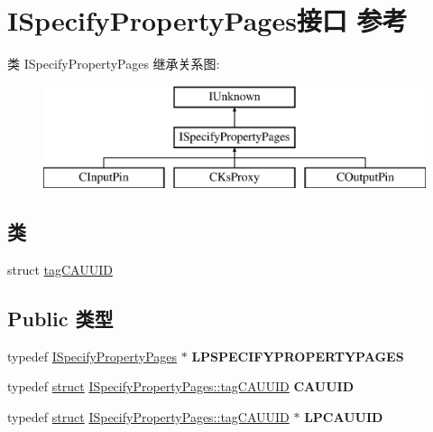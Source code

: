 \hypertarget{interface_i_specify_property_pages}{}\section{I\+Specify\+Property\+Pages接口 参考}
\label{interface_i_specify_property_pages}
类 I\+Specify\+Property\+Pages 继承关系图\+:\begin{figure}[H]
\begin{center}
\leavevmode
\includegraphics[height=3.000000cm]{interface_i_specify_property_pages}
\end{center}
\end{figure}
\subsection*{类}
\begin{DoxyCompactItemize}
\item 
struct \hyperlink{struct_i_specify_property_pages_1_1tag_c_a_u_u_i_d}{tag\+C\+A\+U\+U\+ID}
\end{DoxyCompactItemize}
\subsection*{Public 类型}
\begin{DoxyCompactItemize}
\item 
\mbox{\label{interface_i_specify_property_pages_a275cd18a531e3817d54b170276ea2841}} 
typedef \hyperlink{interface_i_specify_property_pages}{I\+Specify\+Property\+Pages} $\ast$ {\bfseries L\+P\+S\+P\+E\+C\+I\+F\+Y\+P\+R\+O\+P\+E\+R\+T\+Y\+P\+A\+G\+ES}
\item 
\mbox{\label{interface_i_specify_property_pages_a85bfc64b22699c02abb8129fd1be04dc}} 
typedef \hyperlink{interfacestruct}{struct} \hyperlink{struct_i_specify_property_pages_1_1tag_c_a_u_u_i_d}{I\+Specify\+Property\+Pages\+::tag\+C\+A\+U\+U\+ID} {\bfseries C\+A\+U\+U\+ID}
\item 
\mbox{\label{interface_i_specify_property_pages_a3068f57c374b4838e801f231f768af0a}} 
typedef \hyperlink{interfacestruct}{struct} \hyperlink{struct_i_specify_property_pages_1_1tag_c_a_u_u_i_d}{I\+Specify\+Property\+Pages\+::tag\+C\+A\+U\+U\+ID} $\ast$ {\bfseries L\+P\+C\+A\+U\+U\+ID}
\end{DoxyCompactItemize}
